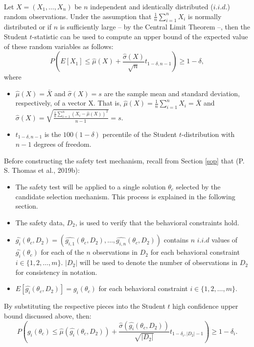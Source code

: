 \documentclass[12pt, twoside]{amherstthesis}
\begin{document}
Let \(X = (X_1, \ldots, X_n)\) be \(n\) independent and identically distributed (\(i.i.d.\)) random observations. Under the assumption that \(\frac{1}{n} \sum_{i=1}^n X_i\) is normally distributed or if \(n\) is sufficiently large -- by the Central Limit Theorem --, then the Student \(t\)-statistic can be used to compute an upper bound of the expected value of these random variables as follows:
\begin{equation}
\label{ch2eq10}
P(E[X_1] \leq \hat{\mu}(X) + \frac{\hat{\sigma}(X)}{\sqrt{n}}t_{1-\delta, n-1}) \geq 1 - \delta,
\end{equation}
where
\begin{itemize}
\item
  \(\hat{\mu}(X) = \bar{X}\) and \(\hat{\sigma}(X) = s\) are the sample mean and standard deviation, respectively, of a vector X. That is, \(\hat{\mu}(X) = \frac{1}{n}\sum_{i=1}^n X_i = \bar{X}\) and \(\hat{\sigma}(X) = \sqrt{\frac{\frac{1}{n}\sum_{i=1}^n (X_i - \hat{\mu}(X))^2}{n-1}} = s\).
\item
  \(t_{1-\delta, n-1}\) is the \(100(1-\delta)\) percentile of the Student \(t\)-distribution with \(n-1\) degrees of freedom.
\end{itemize}
Before constructing the safety test mechanism, recall from Section \ref{sop} that (P. S. Thomas et al., 2019b):
\begin{itemize}
\item
  The safety test will be applied to a single solution \(\theta_c\) selected by the candidate selection mechanism. This process is explained in the following section.
\item
  The safety data, \(D_2\), is used to verify that the behavioral constraints hold.
\item
  \(\hat{g_i}(\theta_c, D_2) = (\hat{g_{i,1}}(\theta_c, D_2), \ldots,\hat{g_{i,n}}(\theta_c, D_2))\) contains \(n\) \(i.i.d\) values of \(\hat{g_i}(\theta_c)\) for each of the \(n\) observations in \(D_2\) for each behavioral constraint \(i \in \{1,2, \ldots, m \}\). \(|D_2|\) will be used to denote the number of observations in \(D_2\) for consistency in notation.
\item
  \(E[\hat{g_i}(\theta_c, D_2)] = g_i(\theta_c)\) for each behavioral constraint \(i \in \{1,2, \ldots, m \}\).
\end{itemize}
By substituting the respective pieces into the Student \(t\) high confidence upper bound discussed above, then:
\begin{equation}
\label{ch2eq11}
P(g_i(\theta_c) \leq \hat{\mu}(\hat{g_i}(\theta_c, D_2)) + \frac{\hat{\sigma}(\hat{g_i}(\theta_c, D_2))}{\sqrt{|D_2|}}t_{1-\delta_i, |D_2|-1}) \geq 1 - \delta_i.
\end{equation}
\end{document}
